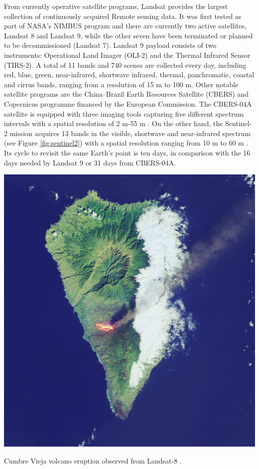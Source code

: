 From currently operative satellite programs, Landsat provides the largest collection of continuously acquired \gls{Remote sensing} data. It was first tested as part of NASA's NIMBUS program and there are currently two active satellites, Landsat 8 and Landsat 9, while the other seven have been terminated or planned to be decommissioned (Landsat 7). Landsat 9 payload consists of two instruments: Operational Land Imager (OLI-2) and the Thermal Infrared Sensor (TIRS-2). A total of 11 bands and 740 scenes are collected every day, including red, blue, green, near-infrared, shortwave infrared, thermal, panchromatic, coastal and cirrus bands, ranging from a resolution of 15 \si{\meter} to 100 \si{\meter}. Other notable satellite programs are the China–Brazil Earth Resources Satellite (CBERS) and Copernicus programme financed by the European Commission. The CBERS-04A satellite is equipped with three imaging tools capturing five different spectrum intervals with a spatial resolution of 2 \si{\meter}-55 \si{\meter} \cite{instituto_nacional_de_pesquisas_espaciais_inpecbers_2019}. On the other hand, the Sentinel-2 mission acquires 13 bands in the visible, shortwave and near-infrared spectrum (see Figure \ref{fig:sentinel2}) with a spatial resolution ranging from 10 \si{\meter} to 60 \si{\meter} \cite{european_environment_agency_eu_2017}. Its cycle to revisit the same Earth's point is ten days, in comparison with the 16 days needed by Landsat 9 or 31 days from CBERS-04A.

\begin{marginfigure}[-1cm]
	\includegraphics{figs/introduction/landsat8_lapalma.jpg}
	\caption{Cumbre Vieja volcano eruption observed from Landsat-8 \cite{nasa_earth_observatory_lava_2021}.}
	\label{fig:la_palma_landsat8}
\end{marginfigure}

